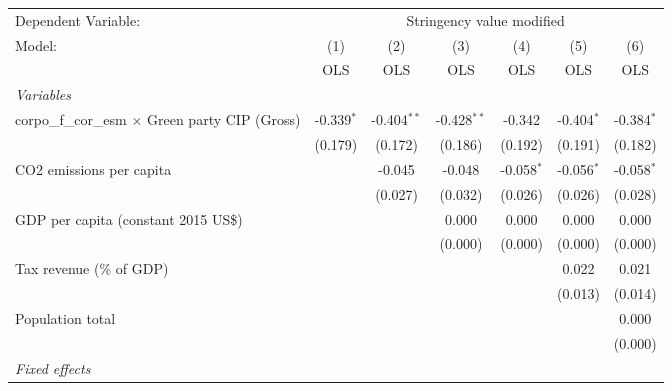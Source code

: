 
\begingroup
\centering
\begin{tabular}{lcccccc}
   \toprule
   Dependent Variable: & \multicolumn{6}{c}{Stringency value modified}\\
   Model:                                                  & (1)          & (2)           & (3)           & (4)          & (5)          & (6)\\  
                                                           &  OLS         & OLS           & OLS           & OLS          & OLS          & OLS\\  
   \midrule
   \emph{Variables}\\
   corpo\_f\_cor\_esm $\times$ Green party CIP (Gross)     & -0.339$^{*}$ & -0.404$^{**}$ & -0.428$^{**}$ & -0.342       & -0.404$^{*}$ & -0.384$^{*}$\\   
                                                           & (0.179)      & (0.172)       & (0.186)       & (0.192)      & (0.191)      & (0.182)\\   
   CO2 emissions per capita                                &              & -0.045        & -0.048        & -0.058$^{*}$ & -0.056$^{*}$ & -0.058$^{*}$\\   
                                                           &              & (0.027)       & (0.032)       & (0.026)      & (0.026)      & (0.028)\\   
   GDP per capita (constant 2015 US\$)                     &              &               & 0.000         & 0.000        & 0.000        & 0.000\\   
                                                           &              &               & (0.000)       & (0.000)      & (0.000)      & (0.000)\\   
   Tax revenue (\% of GDP)                                 &              &               &               &              & 0.022        & 0.021\\   
                                                           &              &               &               &              & (0.013)      & (0.014)\\   
   Population total                                        &              &               &               &              &              & 0.000\\   
                                                           &              &               &               &              &              & (0.000)\\   
   \emph{Fixed effects}\\

\end{tabular}

